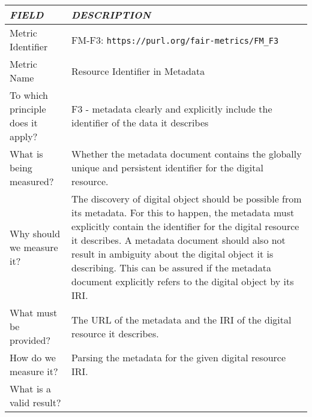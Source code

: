 \documentclass[english]{article}
\begin{document}
\begin{longtable}{|p{5cm}|p{9cm}|}


\hline
\emph{FIELD} & \emph{DESCRIPTION} \\
\hline
Metric Identifier &   FM-F3: \verb"https://purl.org/fair-metrics/FM_F3"
 \\


\hline
Metric Name &   

Resource Identifier in Metadata


 \\



\hline
To which principle does it apply? &   
F3 - metadata clearly and explicitly include the identifier of the data it describes
\\



\hline
What is being measured? & 


Whether the metadata document contains the globally unique and persistent identifier for the digital resource.

\\



\hline
Why should we measure it? & 



The discovery of digital object should be possible from its metadata. For this to happen, the metadata must explicitly contain the identifier for the digital resource it describes. 
A metadata document should also not result in ambiguity about the digital object it is describing. This can be assured if the metadata document explicitly refers to the digital object by its IRI.

  
\\



\hline
What must be provided? &  


The URL of the metadata and the IRI of the digital resource it describes.


 \\



\hline
How do we measure it? &  

Parsing the metadata for the given digital resource IRI.

\\



\hline
What is a valid result? &  



\end{longtable}
\end{document}
